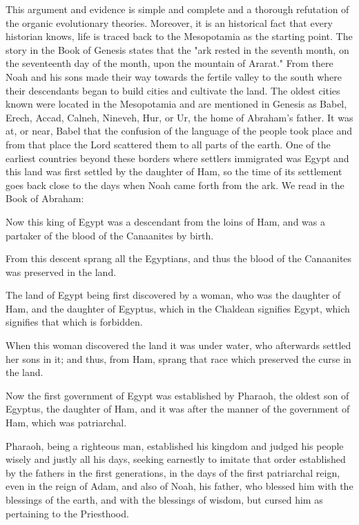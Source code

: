 This argument and evidence is simple and complete and a thorough refutation of the organic
evolutionary theories. Moreover, it is an historical fact that every historian knows, life is
traced back to the Mesopotamia as the starting point. The story in the Book of Genesis states
that the "ark rested in the seventh month, on the seventeenth day of the month, upon the
mountain of Ararat." From there Noah and his sons made their way towards the fertile valley
to the south where their descendants began to build cities and cultivate the land. The oldest
cities known were located in the Mesopotamia and are mentioned in Genesis as Babel, Erech,
Accad, Calneh, Nineveh, Hur, or Ur, the home of Abraham's father. It was at, or near, Babel
that the confusion of the language of the people took place and from that place the Lord
scattered them to all parts of the earth. One of the earliest countries beyond these borders
where settlers immigrated was Egypt and this land was first settled by the daughter of Ham,
so the time of its settlement goes back close to the days when Noah came forth from the ark.
We read in the Book of Abraham:

Now this king of Egypt was a descendant from the loins of Ham, and was a partaker of the
blood of the Canaanites by birth.

From this descent sprang all the Egyptians, and thus the blood of the Canaanites was
preserved in the land.

The land of Egypt being first discovered by a woman, who was the daughter of Ham, and the
daughter of Egyptus, which in the Chaldean signifies Egypt, which signifies that which is
forbidden.

When this woman discovered the land it was under water, who afterwards settled her sons in
it; and thus, from Ham, sprang that race which preserved the curse in the land.

Now the first government of Egypt was established by Pharaoh, the oldest son of Egyptus,
the daughter of Ham, and it was after the manner of the government of Ham, which was
patriarchal.

Pharaoh, being a righteous man, established his kingdom and judged his people wisely and
justly all his days, seeking earnestly to imitate that order established by the fathers in the first
generations, in the days of the first patriarchal reign, even in the reign of Adam, and also of
Noah, his father, who blessed him with the blessings of the earth, and with the blessings of
wisdom, but cursed him as pertaining to the Priesthood.

